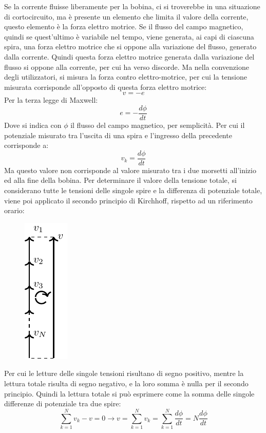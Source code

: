 \documentclass{article}
\numberwithin{equation}{subsection}
\begin{document}
Se la corrente fluisse liberamente per la bobina, ci si troverebbe in una situazione di cortocircuito, ma è presente un elemento che limita il valore della corrente, questo 
elemento è la forza elettro motrice. 
Se il flusso del campo magnetico, quindi se quest'ultimo è variabile nel tempo, viene generata, ai capi di ciascuna spira, una forza elettro motrice che si oppone alla variazione 
del flusso, generato dalla corrente. Quindi questa forza elettro motrice generata dalla variazione del flusso si oppone alla corrente, per cui ha verso discorde. Ma nella 
convenzione degli utilizzatori, si misura la forza contro elettro-motrice, per cui la tensione misurata corrisponde all'opposto di questa forza elettro motrice: 
\begin{equation*}
    v=-e
\end{equation*}
Per la terza legge di Maxwell:
\begin{equation*}
    e=-\displaystyle\frac{d\phi}{dt}
\end{equation*}
Dove si indica con $\phi$ il flusso del campo magnetico, per semplicità. Per cui il potenziale misurato tra l'uscita di una spira e l'ingresso della precedente corrisponde a:
\begin{equation*}
    v_k=\displaystyle\frac{d\phi}{dt}
\end{equation*}
Ma questo valore non corrisponde al valore misurato tra i due morsetti all'inizio ed alla fine della bobina. Per determinare il valore della tensione totale, si considerano 
tutte le tensioni delle singole spire e la differenza di potenziale totale, viene poi applicato il secondo principio di Kirchhoff, rispetto ad un riferimento orario:
\begin{figure}[H]%
    \centering
    \includegraphics{bobina-principio-tensioni.pdf}
    \label{fig:bobina-principio-tensioni}
\end{figure}
Per cui le letture delle singole tensioni risultano di segno positivo, mentre la lettura totale risulta di segno negativo, e la loro somma è nulla per il secondo principio. 
Quindi la lettura totale si può esprimere come la somma delle singole differenze di potenziale tra due spire:
\begin{equation*}
    \displaystyle\sum_{k=1}^Nv_k-v=0\to v=\sum_{k=1}^Nv_k=\sum_{k=1}^N\frac{d\phi}{dt}=N\frac{d\phi}{dt}
\end{equation*}
\end{document}

